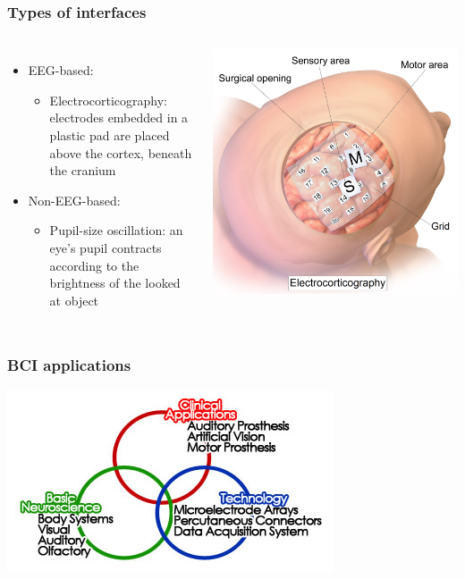 \documentclass{beamer}
\begin{document}
\begin{frame}
	\frametitle{Types of interfaces}
	\begin{columns}
		\begin{itemize}
			\item EEG-based:
			\begin{itemize}
				\item Electrocorticography: electrodes embedded in a plastic pad are placed above the cortex, beneath the cranium
			\end{itemize}
			\item Non-EEG-based:
			\begin{itemize}
				\item Pupil-size oscillation: an eye's pupil contracts according to the brightness of the looked at object
			\end{itemize}
		\end{itemize}
		\includegraphics[scale=.15]{ECoG}
	\end{columns}
\end{frame}
\begin{frame}
	\frametitle{BCI applications}
	\begin{center}
		\includegraphics[scale=.8]{BCI_applications_Venn}
	\end{center}
\end{frame}
\end{document}
